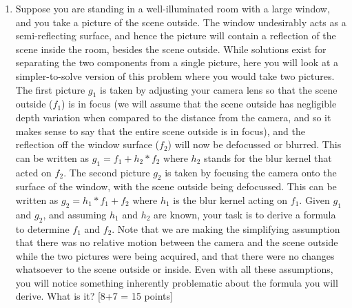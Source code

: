 \documentclass[11pt]{article}
\begin{document}
\begin{enumerate}
\item Suppose you are standing in a well-illuminated room with a large window, and you take a picture of the scene outside. The window undesirably acts as a semi-reflecting surface, and hence the picture will contain a reflection of the scene inside the room, besides the scene outside. While solutions exist for separating the two components from a single picture, here you will look at a simpler-to-solve version of this problem where you would take two pictures. The first picture $g_1$ is taken by adjusting your camera lens so that the scene outside ($f_1$) is in focus (we will assume that the scene outside has negligible depth variation when compared to the distance from the camera, and so it makes sense to say that the entire scene outside is in focus), and the reflection off the window surface ($f_2$) will now be defocussed or blurred.  This can be written as $g_1 = f_1 + h_2 * f_2$ where $h_2$ stands for the blur kernel that acted on $f_2$. The second picture $g_2$ is taken by focusing the camera onto the surface of the window, with the scene outside being defocussed. This can be written as $g_2 = h_1 * f_1 + f_2$ where $h_1$ is the blur kernel acting on $f_1$. Given $g_1$ and $g_2$, and assuming $h_1$ and $h_2$ are known, your task is to derive a formula to determine $f_1$ and $f_2$. Note that we are making the simplifying assumption that there was no relative motion between the camera and the scene outside while the two pictures were being acquired, and that there were no changes whatsoever to the scene outside or inside. Even with all these assumptions, you will notice something inherently problematic about the formula you will derive. What is it? \textsf{[8+7 = 15 points]}


\end{enumerate}
\end{document}
